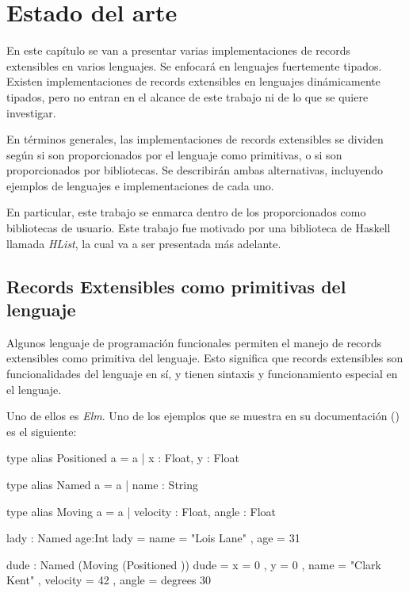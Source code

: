
\chapter{Estado del arte}
\label{ch:2}

En este capítulo se van a presentar varias implementaciones de records extensibles en varios lenguajes. Se enfocará en lenguajes fuertemente tipados. Existen implementaciones de records extensibles en lenguajes dinámicamente tipados, pero no entran en el alcance de este trabajo ni de lo que se quiere investigar.

En términos generales, las implementaciones de records extensibles se dividen según si son proporcionados por el lenguaje como primitivas, o si son proporcionados por bibliotecas. Se describirán ambas alternativas, incluyendo ejemplos de lenguajes e implementaciones de cada uno.

En particular, este trabajo se enmarca dentro de los proporcionados como bibliotecas de usuario. Este trabajo fue motivado por una biblioteca de Haskell llamada \textit{HList}, la cual va a ser presentada más adelante.

\section{Records Extensibles como primitivas del lenguaje}

Algunos lenguaje de programación funcionales permiten el manejo de records extensibles como primitiva del lenguaje. Esto significa que records extensibles son funcionalidades del lenguaje en sí, y tienen sintaxis y funcionamiento especial en el lenguaje.

Uno de ellos es \textit{Elm}\cite{Czaplicki:2013:AFR:2499370.2462161}. Uno de los ejemplos que se muestra en su documentación (\cite{ElmRecords}) es el siguiente:

\begin{code}
type alias Positioned a =
  { a | x : Float, y : Float }

type alias Named a =
  { a | name : String }

type alias Moving a =
  { a | velocity : Float, angle : Float }

lady : Named { age:Int }
lady =
  { name = "Lois Lane"
  , age = 31
  }

dude : Named (Moving (Positioned {}))
dude =
  { x = 0
  , y = 0
  , name = "Clark Kent"
  , velocity = 42
  , angle = degrees 30
  }
\end{code}

